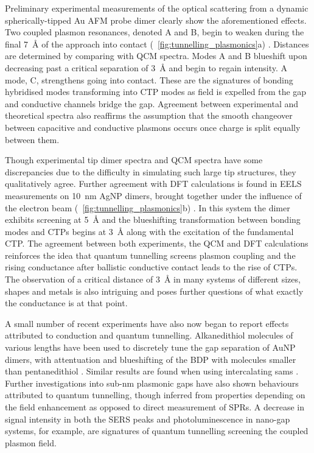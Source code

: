\documentclass{article}
\begin{document}
Preliminary experimental measurements of the optical scattering from a dynamic spherically-tipped Au AFM probe dimer clearly show the aforementioned effects. Two coupled plasmon resonances, denoted A and B, begin to weaken during the final \SI{7}{\angstrom} of the approach into contact (\figurename~\ref{fig:tunnelling_plasmonics}a) \cite{savage2012}. Distances are determined by comparing with QCM spectra. Modes A and B blueshift upon decreasing past a critical separation of \SI{3}{\angstrom} and begin to regain intensity. A mode, C, strengthens going into contact. These are the signatures of bonding hybridised modes transforming into CTP modes as field is expelled from the gap and conductive channels bridge the gap. Agreement between experimental and theoretical spectra also reaffirms the assumption that the smooth changeover between capacitive and conductive plasmons occurs once charge is split equally between them.

Though experimental tip dimer spectra and QCM spectra have some discrepancies due to the difficulty in simulating such large tip structures, they qualitatively agree. Further agreement with DFT calculations is found in EELS measurements on \SI{10}{nm} AgNP dimers, brought together under the influence of the electron beam (\figurename~\ref{fig:tunnelling_plasmonics}b) \cite{scholl2013}. In this system the dimer exhibits screening at \SI{5}{\angstrom} and the blueshifting transformation between bonding modes and CTPs begins at \SI{3}{\angstrom} along with the excitation of the fundamental CTP. The agreement between both experiments, the QCM and DFT calculations reinforces the idea that quantum tunnelling screens plasmon coupling and the rising conductance after ballistic conductive contact leads to the rise of CTPs. The observation of a critical distance of \SI{3}{\angstrom} in many systems of different sizes, shapes and metals is also intriguing and poses further questions of what exactly the conductance is at that point.

A small number of recent experiments have also now began to report effects attributed to conduction and quantum tunnelling. Alkanedithiol molecules of various lengths have been used to discretely tune the gap separation of AuNP dimers, with attentuation and blueshifting of the BDP with molecules smaller than pentanedithiol \cite{cha2014}. Similar results are found when using intercalating \glspl{sam} \cite{tan2014}.
Further investigations into sub-nm plasmonic gaps have also shown behaviours attributed to quantum tunnelling, though inferred from properties depending on the field enhancement as opposed to direct measurement of SPRs. A decrease in signal intensity in both the SERS peaks \cite{zhu2014} and photoluminescence \cite{kravtsov2014} in nano-gap systems, for example, are signatures of quantum tunnelling screening the coupled plasmon field.
\end{document}

